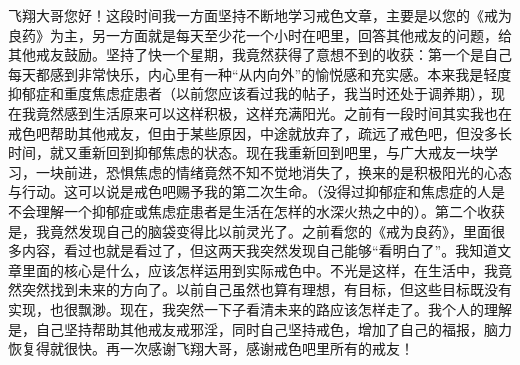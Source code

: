 \begin{case}
    飞翔大哥您好！这段时间我一方面坚持不断地学习戒色文章，主要是以您的《戒为良药》为主，另一方面就是每天至少花一个小时在吧里，回答其他戒友的问题，给其他戒友鼓励。坚持了快一个星期，我竟然获得了意想不到的收获：第一个是自己每天都感到非常快乐，内心里有一种“从内向外”的愉悦感和充实感。本来我是轻度抑郁症和重度焦虑症患者（以前您应该看过我的帖子，我当时还处于调养期），现在我竟然感到生活原来可以这样积极，这样充满阳光。之前有一段时间其实我也在戒色吧帮助其他戒友，但由于某些原因，中途就放弃了，疏远了戒色吧，但没多长时间，就又重新回到抑郁焦虑的状态。现在我重新回到吧里，与广大戒友一块学习，一块前进，恐惧焦虑的情绪竟然不知不觉地消失了，换来的是积极阳光的心态与行动。这可以说是戒色吧赐予我的第二次生命。（没得过抑郁症和焦虑症的人是不会理解一个抑郁症或焦虑症患者是生活在怎样的水深火热之中的）。第二个收获是，我竟然发现自己的脑袋变得比以前灵光了。之前看您的《戒为良药》，里面很多内容，看过也就是看过了，但这两天我突然发现自己能够“看明白了”。我知道文章里面的核心是什么，应该怎样运用到实际戒色中。不光是这样，在生活中，我竟然突然找到未来的方向了。以前自己虽然也算有理想，有目标，但这些目标既没有实现，也很飘渺。现在，我突然一下子看清未来的路应该怎样走了。我个人的理解是，自己坚持帮助其他戒友戒邪淫，同时自己坚持戒色，增加了自己的福报，脑力恢复得就很快。再一次感谢飞翔大哥，感谢戒色吧里所有的戒友！


\end{case}
